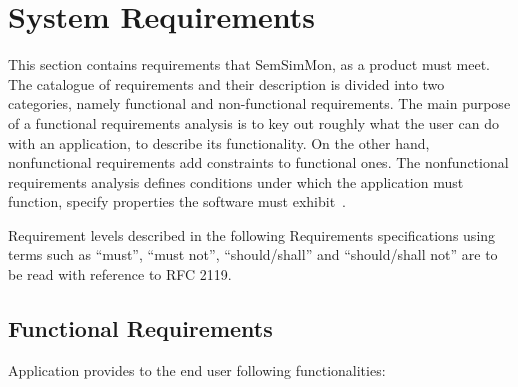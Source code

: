 \section{System Requirements}
\label{sec:SystemRequirements}

This section contains requirements that SemSimMon, as a product must meet. The catalogue of requirements and their description is divided into two categories, namely functional and non-functional requirements. The main purpose of a functional requirements analysis is to key out roughly what the user can do with an application, to describe its functionality. On the other hand, nonfunctional requirements add constraints to functional ones. The nonfunctional requirements analysis defines conditions under which the application must function, specify properties the software must exhibit~\cite{Windle:SoftReq}.

Requirement levels described in the following Requirements specifications using terms such as ``must'', ``must not'', ``should/shall'' and ``should/shall not'' are to be read with reference to RFC 2119\cite{rfc:2119}.

\subsection{Functional Requirements}
\label{subsec:FunctionalRequirements}

Application provides to the end user following functionalities: 

